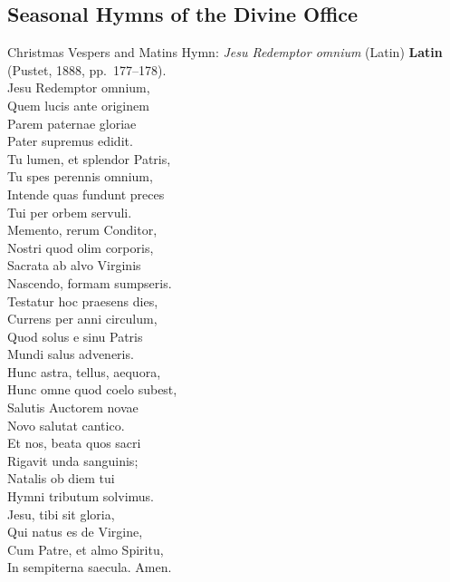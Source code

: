 \subsection{Seasonal Hymns of the Divine Office}

\begin{massbox}{Christmas Vespers and Matins Hymn: \textit{Jesu Redemptor omnium} (Latin)}
\textbf{Latin} (Pustet, 1888, pp.~177--178).\\
Jesu Redemptor omnium,\\
Quem lucis ante originem\\
Parem paternae gloriae\\
Pater supremus edidit.\\[0.4em]
Tu lumen, et splendor Patris,\\
Tu spes perennis omnium,\\
Intende quas fundunt preces\\
Tui per orbem servuli.\\[0.4em]
Memento, rerum Conditor,\\
Nostri quod olim corporis,\\
Sacrata ab alvo Virginis\\
Nascendo, formam sumpseris.\\[0.4em]
Testatur hoc praesens dies,\\
Currens per anni circulum,\\
Quod solus e sinu Patris\\
Mundi salus adveneris.\\[0.4em]
Hunc astra, tellus, aequora,\\
Hunc omne quod coelo subest,\\
Salutis Auctorem novae\\
Novo salutat cantico.\\[0.4em]
Et nos, beata quos sacri\\
Rigavit unda sanguinis;\\
Natalis ob diem tui\\
Hymni tributum solvimus.\\[0.4em]
Jesu, tibi sit gloria,\\
Qui natus es de Virgine,\\
Cum Patre, et almo Spiritu,\\
In sempiterna saecula. Amen.
\end{massbox}


